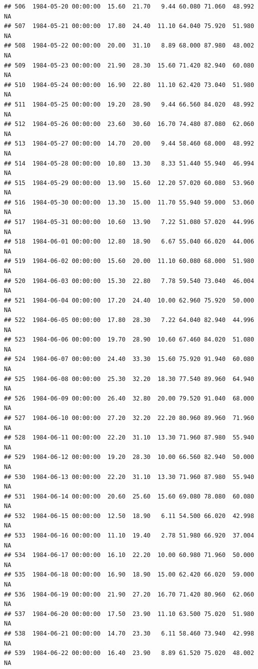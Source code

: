 \documentclass{article}\usepackage{graphicx, color}
\makeatletter
\newenvironment{kframe}{%
 \def\at@end@of@kframe{}%
 \ifinner\ifhmode%
  \def\at@end@of@kframe{\end{minipage}}%
  \begin{minipage}{\columnwidth}%
 \fi\fi%
 \def\FrameCommand##1{\hskip\@totalleftmargin \hskip-\fboxsep
 \colorbox{shadecolor}{##1}\hskip-\fboxsep
     \hskip-\linewidth \hskip-\@totalleftmargin \hskip\columnwidth}%
 \MakeFramed {\advance\hsize-\width
   \@totalleftmargin\z@ \linewidth\hsize
   \@setminipage}}%
 {\par\unskip\endMakeFramed%
 \at@end@of@kframe}
\newenvironment{knitrout}{}{} %
\makeatother
\begin{document}
\begin{knitrout}
\begin{kframe}
\begin{verbatim}
## 506  1984-05-20 00:00:00  15.60  21.70   9.44 60.080 71.060  48.992     NA
## 507  1984-05-21 00:00:00  17.80  24.40  11.10 64.040 75.920  51.980     NA
## 508  1984-05-22 00:00:00  20.00  31.10   8.89 68.000 87.980  48.002     NA
## 509  1984-05-23 00:00:00  21.90  28.30  15.60 71.420 82.940  60.080     NA
## 510  1984-05-24 00:00:00  16.90  22.80  11.10 62.420 73.040  51.980     NA
## 511  1984-05-25 00:00:00  19.20  28.90   9.44 66.560 84.020  48.992     NA
## 512  1984-05-26 00:00:00  23.60  30.60  16.70 74.480 87.080  62.060     NA
## 513  1984-05-27 00:00:00  14.70  20.00   9.44 58.460 68.000  48.992     NA
## 514  1984-05-28 00:00:00  10.80  13.30   8.33 51.440 55.940  46.994     NA
## 515  1984-05-29 00:00:00  13.90  15.60  12.20 57.020 60.080  53.960     NA
## 516  1984-05-30 00:00:00  13.30  15.00  11.70 55.940 59.000  53.060     NA
## 517  1984-05-31 00:00:00  10.60  13.90   7.22 51.080 57.020  44.996     NA
## 518  1984-06-01 00:00:00  12.80  18.90   6.67 55.040 66.020  44.006     NA
## 519  1984-06-02 00:00:00  15.60  20.00  11.10 60.080 68.000  51.980     NA
## 520  1984-06-03 00:00:00  15.30  22.80   7.78 59.540 73.040  46.004     NA
## 521  1984-06-04 00:00:00  17.20  24.40  10.00 62.960 75.920  50.000     NA
## 522  1984-06-05 00:00:00  17.80  28.30   7.22 64.040 82.940  44.996     NA
## 523  1984-06-06 00:00:00  19.70  28.90  10.60 67.460 84.020  51.080     NA
## 524  1984-06-07 00:00:00  24.40  33.30  15.60 75.920 91.940  60.080     NA
## 525  1984-06-08 00:00:00  25.30  32.20  18.30 77.540 89.960  64.940     NA
## 526  1984-06-09 00:00:00  26.40  32.80  20.00 79.520 91.040  68.000     NA
## 527  1984-06-10 00:00:00  27.20  32.20  22.20 80.960 89.960  71.960     NA
## 528  1984-06-11 00:00:00  22.20  31.10  13.30 71.960 87.980  55.940     NA
## 529  1984-06-12 00:00:00  19.20  28.30  10.00 66.560 82.940  50.000     NA
## 530  1984-06-13 00:00:00  22.20  31.10  13.30 71.960 87.980  55.940     NA
## 531  1984-06-14 00:00:00  20.60  25.60  15.60 69.080 78.080  60.080     NA
## 532  1984-06-15 00:00:00  12.50  18.90   6.11 54.500 66.020  42.998     NA
## 533  1984-06-16 00:00:00  11.10  19.40   2.78 51.980 66.920  37.004     NA
## 534  1984-06-17 00:00:00  16.10  22.20  10.00 60.980 71.960  50.000     NA
## 535  1984-06-18 00:00:00  16.90  18.90  15.00 62.420 66.020  59.000     NA
## 536  1984-06-19 00:00:00  21.90  27.20  16.70 71.420 80.960  62.060     NA
## 537  1984-06-20 00:00:00  17.50  23.90  11.10 63.500 75.020  51.980     NA
## 538  1984-06-21 00:00:00  14.70  23.30   6.11 58.460 73.940  42.998     NA
## 539  1984-06-22 00:00:00  16.40  23.90   8.89 61.520 75.020  48.002     NA

\end{verbatim}
\end{kframe}
\end{knitrout}
\end{document}

